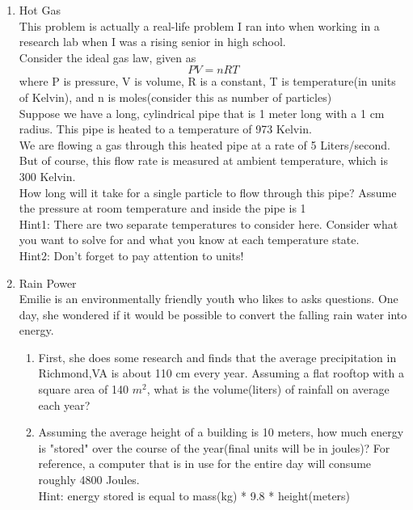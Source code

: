 \documentclass{article}
\begin{document}
\begin{enumerate}
    \item Hot Gas\\
    This problem is actually a real-life problem I ran into when working in a research lab when I was a rising senior in high school.\\ 
    Consider the ideal gas law, given as 
    \[ PV = nRT \]
    where P is pressure, V is volume, R is a constant, T is temperature(in units of Kelvin), and n is moles(consider this as number of particles)\\
    Suppose we have a long, cylindrical pipe that is 1 meter long with a 1 cm radius. This pipe is heated to a temperature of 973 Kelvin.\\
    We are flowing a gas through this heated pipe at a rate of 5 Liters/second. But of course, this flow rate is measured at ambient temperature, which is 300 Kelvin. \\
    \newline
    How long will it take for a single particle to flow through this pipe? Assume the pressure at room temperature and inside the pipe is 1\\
    \newline
    Hint1: There are two separate temperatures to consider here. Consider what you want to solve for and what you know at each temperature state. \\
    Hint2: Don't forget to pay attention to units!
    
    \item Rain Power\\
    Emilie is an environmentally friendly youth who likes to asks questions. One day, she wondered if it would be possible to convert the falling rain water into energy.
    \begin{enumerate}
        \item First, she does some research and finds that the average precipitation in Richmond,VA is about 110 cm every year. Assuming a flat rooftop with a square area of 140 $m^2$, what is the volume(liters) of rainfall on average each year?\\
        \item Assuming the average height of a building is 10 meters, how much energy is "stored" over the course of the year(final units will be in joules)?        For reference, a computer that is in use for the entire day will consume roughly 4800 Joules. \\
        Hint: energy stored is equal to mass(kg) * 9.8 * height(meters)\\


\end{enumerate}
\end{enumerate}
\end{document}
